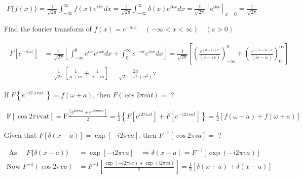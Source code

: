 \begin{answer}
	\begin{align*}
	F\{f(x)\}=\frac{1}{\sqrt{2 \pi}} \int_{-\infty}^{\infty} f(x) e^{i k x} d x=\frac{1}{\sqrt{2 \pi}} \int_{-\infty}^{\infty} \delta(x) e^{i k x} d x=\frac{1}{\sqrt{2 \pi}}\left[\mathrm{e}^{i k x}\right]_{x=0}=\frac{1}{\sqrt{2 \pi}}
	\end{align*}
\end{answer}
\begin{exercise}
	Find the fourier transform of $f(x)=e^{-a|x|} \quad(-\infty<x<\infty) \quad(a>0)$
\end{exercise}
\begin{answer}
	\begin{align*}
	\begin{aligned}
	F\left[e^{-a|x|}\right] &=\frac{1}{\sqrt{2 \pi}}\left[\int_{-\infty}^{0} e^{a x} e^{i s x} d x+\int_{0}^{\infty} e^{-a x} e^{i s x} d x\right]=\frac{1}{\sqrt{2 \pi}}\left[\left(\frac{e^{(a+i s) x}}{(a+i s)}\right)_{-\infty}^{0}+\left(\frac{e^{-(a-i s) x}}{(i s-a)}\right)_{0}^{\infty}\right] \\
	&=\frac{1}{\sqrt{2 \pi}}\left[\frac{1}{a+i s}+\frac{1}{a-i s}\right]=\frac{2 a}{\sqrt{2 \pi}\left(s^{2}+a^{2}\right)} \because
	\end{aligned}
	\end{align*}
\end{answer}
\begin{exercise}
	If $F\left\{e^{-i 2 \text { avat }}\right\}=f(\omega+a)$, then $F(\cos 2 \pi v a t)=$ ?
\end{exercise}
\begin{answer}
	\begin{align*}
	\mathrm{F}[\cos 2 \pi v \mathrm{vat}]=\mathrm{F} \frac{\left[\mathrm{e}^{\mathrm{i} 2 \pi \mathrm{vat}}+\mathrm{e}^{-\mathrm{i} 2 \pi \mathrm{vat}}\right]}{2}=\frac{1}{2}\left\{F\left[e^{i 2 \pi v a t}\right]+F\left[e^{-i 2 \pi v a t}\right]\right\}=\frac{1}{2}[f(\omega-a)+f(\omega+a)]
	\end{align*}
\end{answer}
\begin{exercise}
	Given that $F[\delta(x-a)]=\exp [-i 2 \pi v a]$, then $F^{-1}[\cos 2 \pi v a]=$ ?
\end{exercise}
\begin{answer}
	\begin{align*}
\text{	As }\quad F\{\delta(x-a)\}&=\exp [-i 2 \pi v a] \quad \Rightarrow \delta(x-a)=F^{-1}[\exp (-i 2 \pi v a)]\\
	\text{Now }F^{-1}(\cos 2 \pi v a)&=F^{-1}\left[\frac{\exp (-i 2 \pi v a)+\exp (i 2 \pi v a)}{2}\right]=\frac{1}{2}[\delta(x+a)+\delta(x-a)]
	\end{align*}
\end{answer}
